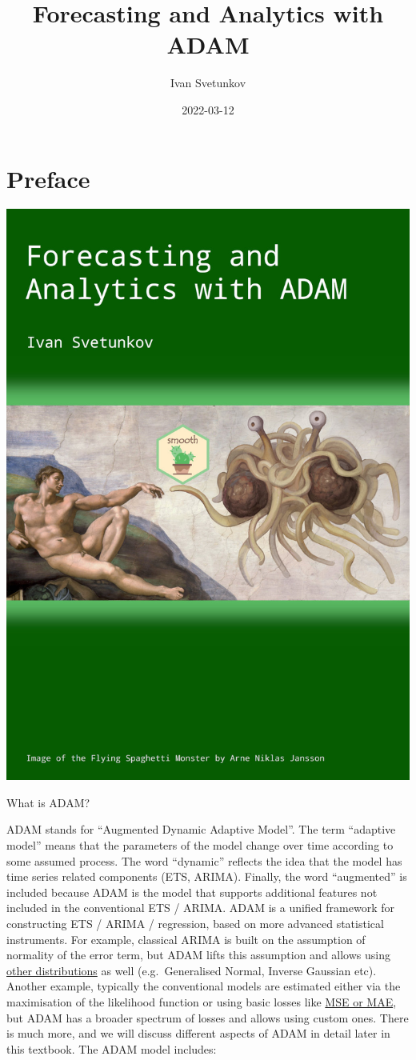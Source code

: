 \documentclass[
]{book}
\title{Forecasting and Analytics with ADAM}
\author{Ivan Svetunkov}
\date{2022-03-12}
\theoremstyle{definition}
\theoremstyle{definition}
\theoremstyle{definition}
\theoremstyle{definition}
\theoremstyle{remark}
\begin{document}
\maketitle

{
\setcounter{tocdepth}{1}
\tableofcontents
}
\hypertarget{preface}{%
\chapter*{Preface}\label{preface}}

\begin{center}\includegraphics[width=0.6\linewidth]{images/Adam-Title-web} \end{center}

What is ADAM?

ADAM stands for ``Augmented Dynamic Adaptive Model''. The term ``adaptive model'' means that the parameters of the model change over time according to some assumed process. The word ``dynamic'' reflects the idea that the model has time series related components (ETS, ARIMA). Finally, the word ``augmented'' is included because ADAM is the model that supports additional features not included in the conventional ETS / ARIMA. ADAM is a unified framework for constructing ETS / ARIMA / regression, based on more advanced statistical instruments. For example, classical ARIMA is built on the assumption of normality of the error term, but ADAM lifts this assumption and allows using \protect\hyperlink{distributions}{other distributions} as well (e.g.~Generalised Normal, Inverse Gaussian etc). Another example, typically the conventional models are estimated either via the maximisation of the likelihood function or using basic losses like \protect\hyperlink{errorMeasures}{MSE or MAE}, but ADAM has a broader spectrum of losses and allows using custom ones. There is much more, and we will discuss different aspects of ADAM in detail later in this textbook. The ADAM model includes:
\end{document}

